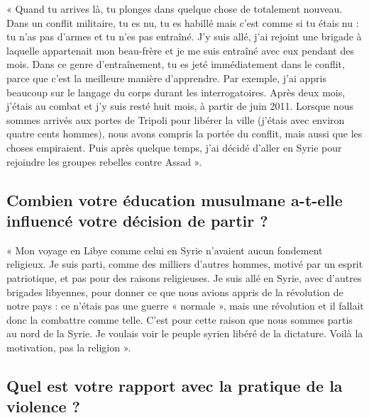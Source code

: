 « Quand tu arrives là, tu plonges dans quelque chose de totalement
nouveau. Dans un conflit militaire, tu es nu, tu es habillé mais c'est
comme si tu étais nu : tu n'as pas d'armes et tu n'es pas entraîné. J'y
suis allé, j'ai rejoint une brigade à laquelle appartenait mon
beau-frère et je me suis entraîné avec eux pendant des mois. Dans ce
genre d'entraînement, tu es jeté immédiatement dans le conflit, parce
que c'est la meilleure manière d'apprendre. Par exemple, j'ai appris
beaucoup sur le langage du corps durant les interrogatoires. Après deux
mois, j'étais au combat et j'y suis resté huit mois, à partir de juin
2011. Lorsque nous sommes arrivés aux portes de Tripoli pour libérer la
ville (j'étais avec environ quatre cents hommes), nous avons compris la
portée du conflit, mais aussi que les choses empiraient. Puis après
quelque temps, j'ai décidé d'aller en Syrie pour rejoindre les groupes
rebelles contre Assad ».

\hypertarget{combien-votre-uxe9ducation-musulmane-a-t-elle-influencuxe9-votre-duxe9cision-de-partir}{%
\subsection{Combien votre éducation musulmane a-t-elle influencé votre
décision de partir
?}\label{combien-votre-uxe9ducation-musulmane-a-t-elle-influencuxe9-votre-duxe9cision-de-partir}}

« Mon voyage en Libye comme celui en Syrie n'avaient aucun fondement
religieux. Je suis parti, comme des milliers d'autres hommes, motivé par
un esprit patriotique, et pas pour des raisons religieuses. Je suis allé
en Syrie, avec d'autres brigades libyennes, pour donner ce que nous
avions appris de la révolution de notre pays : ce n'étais pas une guerre
« normale », mais une révolution et il fallait donc la combattre comme
telle. C'est pour cette raison que nous sommes partis au nord de la
Syrie. Je voulais voir le peuple syrien libéré de la dictature. Voilà la
motivation, pas la religion ».

\hypertarget{quel-est-votre-rapport-avec-la-pratique-de-la-violence}{%
\subsection{Quel est votre rapport avec la pratique de la violence
?}\label{quel-est-votre-rapport-avec-la-pratique-de-la-violence}}

